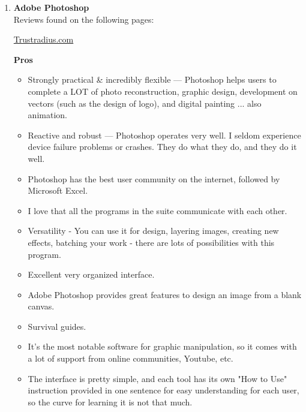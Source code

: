 \documentclass[a4paper,12pt]{article}
\begin{document}
\begin{enumerate}
\item \textbf{Adobe Photoshop}\\
  Reviews found on the following pages:
  \begin{center}
    \href{https://www.trustradius.com/products/adobe-photoshop/reviews}{Trustradius.com}\\
  \end{center}

  \textbf{Pros}
  \begin{itemize}
  \item Strongly practical \& incredibly flexible — Photoshop helps users to complete a LOT of photo reconstruction, graphic design, development on vectors (such as the design of logo), and digital painting ... also animation.
  \item Reactive and robust — Photoshop operates very well. I seldom experience device failure problems or crashes. They do what they do, and they do it well.
  \item Photoshop has the best user community on the internet, followed by Microsoft Excel.
  \item I love that all the programs in the suite communicate with each other.
  \item Versatility - You can use it for design, layering images, creating new effects, batching your work - there are lots of possibilities with this program.
  \item Excellent very organized interface.
  \item Adobe Photoshop provides great features to design an image from a blank canvas.
  \item Survival guides.
  \item It's the most notable software for graphic manipulation, so it comes with a lot of support from online communities, Youtube, etc.
  \item The interface is pretty simple, and each tool has its own "How to Use" instruction provided in one sentence for easy understanding for each user, so the curve for learning it is not that much.
  \end{itemize}
  

\end{enumerate}
\end{document}
